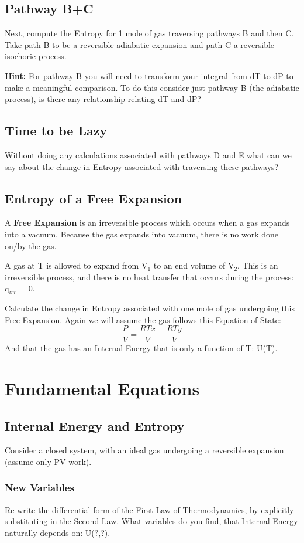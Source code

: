 \documentclass{article}
\newcommand{\be}{\begin{equation}}
\newcommand{\ee}{\end{equation}}
\begin{document}
\subsection{Pathway B+C}
Next, compute the Entropy for 1 mole of gas traversing pathways B and then C.  
Take path B to be a reversible adiabatic expansion and path C a reversible isochoric process. 

\textbf{Hint:}
For pathway B you will need to transform your integral from dT to dP to make a meaningful comparison. 
To do this consider just pathway B (the adiabatic process), is there any relationship relating dT and dP?

\subsection{Time to be Lazy}
Without doing any calculations associated with pathways D and E what can we say about the change in Entropy associated with traversing these pathways?

\subsection{Entropy of a Free Expansion}
A \textbf{Free Expansion} is an irreversible process which occurs when a gas expands into a vacuum. 
Because the gas expands into vacuum, there is no work done on/by the gas. 

A gas at T is allowed to expand from V$_1$ to an end volume of V$_2$. 
This is an irreversible process, and there is no heat transfer that occurs during the process: q$_{irr}$ = 0.

Calculate the change in Entropy associated with one mole of gas undergoing this Free Expansion. 
Again we will assume the gas follows this Equation of State:
\be
\frac{P}{V}=\frac{RTx}{V}+\frac{RTy}{V}
\ee
And that the gas has an Internal Energy that is only a function of T: U(T).

\section{Fundamental Equations}

\subsection{Internal Energy and Entropy}
Consider a closed system, with an ideal gas undergoing a reversible expansion (assume only PV work). 

\subsubsection{New Variables}
Re-write the differential form of the  First Law of Thermodynamics, by explicitly substituting in the Second Law. 
What variables do you find, that Internal Energy naturally depends on: U(?,?). 
\end{document}

